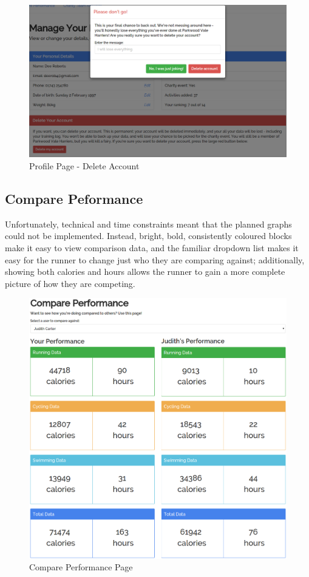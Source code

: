 \documentclass{article}[12pt,a4paper]
\begin{document}
\begin{figure}[h!]
  \includegraphics[scale=0.35]{final_ui/account_delete}
  \caption{Profile Page - Delete Account}
\end{figure}
\clearpage

\subsection{Compare Peformance}
Unfortunately, technical and time constraints meant that the planned graphs could not be implemented. Instead, bright, bold, consistently coloured blocks make it easy to view comparison data, and the familiar dropdown list makes it easy for the runner to change just who they are comparing against; additionally, showing both calories and hours allows the runner to gain a more complete picture of how they are competing.

\begin{figure}[h!]
  \includegraphics[scale=0.35]{final_ui/compare_performance}
  \caption{Compare Performance Page}
\end{figure}
\end{document}
